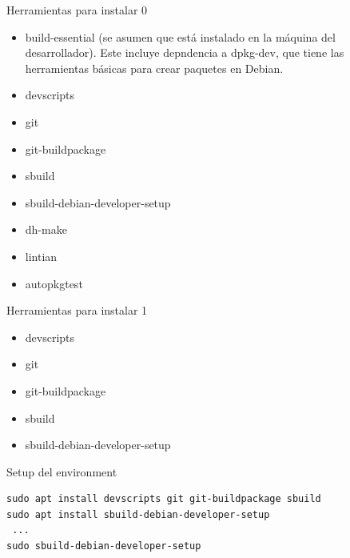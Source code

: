 \documentclass{beamer}
\begin{document}
\begin{frame}{Herramientas para instalar 0}
  \begin{itemize}
    \item build-essential (se asumen que está instalado en la máquina del desarrollador). Este incluye depndencia a dpkg-dev, que tiene las herramientas básicas para crear paquetes en Debian.
    \item devscripts
    \item git
    \item git-buildpackage
    \item sbuild
    \item sbuild-debian-developer-setup
    \item dh-make
    \item lintian
    \item autopkgtest
  \end{itemize}
\end{frame}


\begin{frame}{Herramientas para instalar 1}
  \begin{itemize}
    \item devscripts
    \item git
    \item git-buildpackage
    \item sbuild
    \item sbuild-debian-developer-setup
  \end{itemize}
\end{frame}

\begin{frame}[fragile=singleslide]{Setup del environment}
\begin{verbatim}
sudo apt install devscripts git git-buildpackage sbuild
sudo apt install sbuild-debian-developer-setup
 ...
sudo sbuild-debian-developer-setup
\end{verbatim}
\end{frame}
\end{document}
